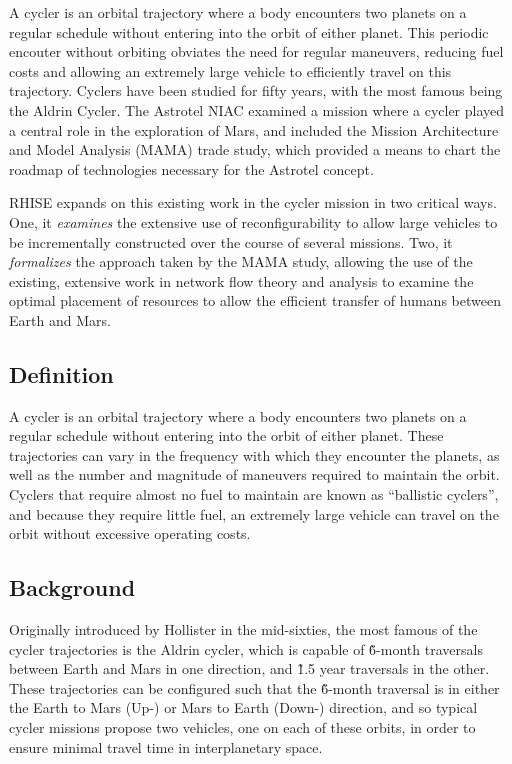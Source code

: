 \documentclass[NIACPhase1B.tex]{subfiles}
\begin{document}
A cycler is an orbital trajectory where a body encounters two planets on a regular schedule without entering into the orbit of either planet. This periodic encouter without orbiting obviates the need for regular maneuvers, reducing fuel costs and allowing an extremely large vehicle to efficiently travel on this trajectory. Cyclers have been studied for fifty years, with the most famous being the Aldrin Cycler. The Astrotel NIAC examined a mission where a cycler played a central role in the exploration of Mars, and included the Mission Architecture and Model Analysis (MAMA) trade study, which provided a means to chart the roadmap of technologies necessary for the Astrotel concept. 

RHISE expands on this existing work in the cycler mission in two critical ways. One, it \emph{examines} the extensive use of reconfigurability to allow large vehicles to be incrementally constructed over the course of several missions. Two, it \emph{formalizes} the approach taken by the MAMA study, allowing the use of the existing, extensive work in network flow theory and analysis to examine the optimal placement of resources to allow the efficient transfer of humans between Earth and Mars. 

\subsection{Definition}
A cycler is an orbital trajectory where a body encounters two planets on a regular schedule without entering into the orbit of either planet. These trajectories can vary in the frequency with which they encounter the planets, as well as the number and magnitude of maneuvers required to maintain the orbit. Cyclers that require almost no fuel to maintain are known as ``ballistic cyclers'', and because they require little fuel, an extremely large vehicle can travel on the orbit without excessive operating costs. 

\subsection{Background}
Originally introduced by Hollister in the mid-sixties, the most famous of the cycler trajectories is the Aldrin cycler, which is capable of \~6-month traversals between Earth and Mars in one direction, and \~1.5 year traversals in the other. These trajectories can be configured such that the \~6-month traversal is in either the Earth to Mars (Up-) or Mars to Earth (Down-) direction, and so typical cycler missions propose two vehicles, one on each of these orbits, in order to ensure minimal travel time in interplanetary space.
\end{document}
